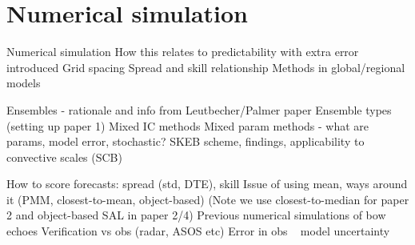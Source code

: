 \section{Numerical simulation}
Numerical simulation 
How this relates to predictability with extra error introduced
Grid spacing
Spread and skill relationship
Methods in global/regional models

Ensembles - rationale and info from Leutbecher/Palmer paper
Ensemble types (setting up paper 1)
Mixed IC methods
Mixed param methods - what are params, model error, stochastic?
SKEB scheme, findings, applicability to convective scales (SCB)

How to score forecasts: spread (std, DTE), skill 
Issue of using mean, ways around it (PMM, closest-to-mean, object-based)
(Note we use closest-to-median for paper 2 and object-based SAL in paper 2/4)
Previous numerical simulations of bow echoes
Verification vs obs (radar, ASOS etc)
Error in obs ~ model uncertainty

